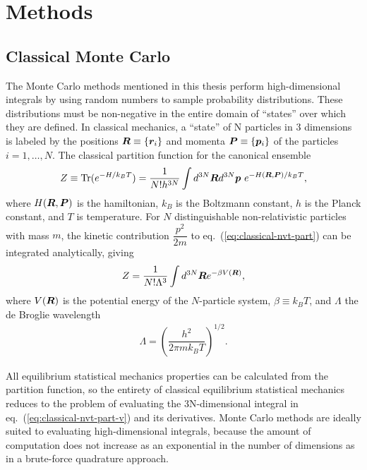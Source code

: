 \chapter{Methods} \label{chap:method}
\section{Classical Monte Carlo}
The Monte Carlo methods mentioned in this thesis perform high-dimensional integrals by using random numbers to sample probability distributions. These distributions must be non-negative in the entire domain of ``states'' over which they are defined. In classical mechanics, a ``state'' of N particles in $3$ dimensions is labeled by the positions $\boldsymbol{R}\equiv\{\boldsymbol{r}_i\}$ and momenta $\boldsymbol{P}\equiv\{\boldsymbol{p}_i\}$ of the particles $i=1,\dots,N$. The classical partition function for the canonical ensemble
\begin{align} \label{eq:classical-nvt-part}
Z \equiv \text{Tr}(e^{-H/k_BT}) = \dfrac{1}{N!h^{3N}} \int d^{3N}\boldsymbol{R} d^{3N}\boldsymbol{p}~e^{-H(\boldsymbol{R}, \boldsymbol{P})/k_BT},
\end{align}
where $H(\boldsymbol{R}, \boldsymbol{P})$ is the hamiltonian, $k_B$ is the Boltzmann constant, $h$ is the Planck constant, and $T$ is temperature. For $N$ distinguishable non-relativistic particles with mass $m$, the kinetic contribution $\dfrac{p^2}{2m}$ to eq.~(\ref{eq:classical-nvt-part}) can be integrated analytically, giving
\begin{align}\label{eq:classical-nvt-part-v}
Z = \dfrac{1}{N!\Lambda^{3}} \int d^{3N}\boldsymbol{R} e^{-\beta V(\boldsymbol{R})},
\end{align}
where $V(\boldsymbol{R})$ is the potential energy of the $N$-particle system, $\beta\equiv k_BT$, and $\Lambda$ the de Broglie wavelength
\begin{align} \label{eq:debroglie}
\Lambda = \left(
\dfrac{h^2}{2\pi mk_BT}
\right)^{1/2}.
\end{align}

All equilibrium statistical mechanics properties can be calculated from the partition function, so the entirety of classical equilibrium statistical mechanics reduces to the problem of evaluating the 3N-dimensional integral in eq.~(\ref{eq:classical-nvt-part-v}) and its derivatives. Monte Carlo methods are ideally suited to evaluating high-dimensional integrals, because the amount of computation does not increase as an exponential in the number of dimensions as in a brute-force quadrature approach.

